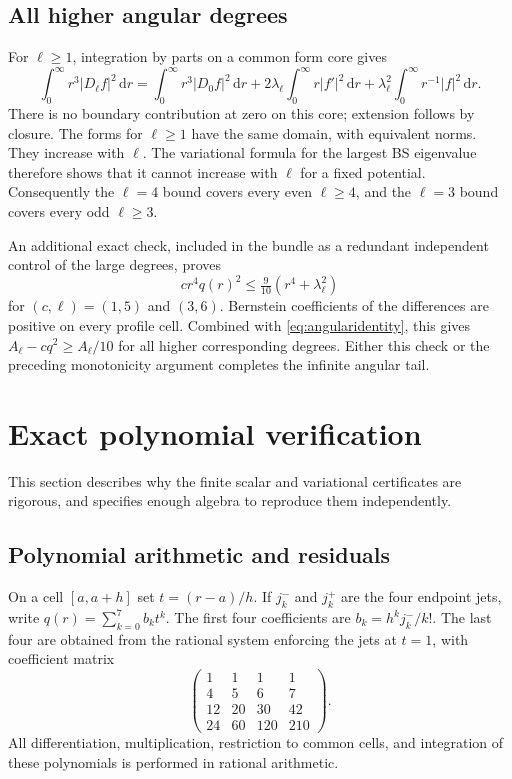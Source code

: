 \documentclass[11pt,a4paper]{article}
\theoremstyle{definition}\newtheorem{definition}[theorem]{Definition}
\theoremstyle{remark}\newtheorem{remark}[theorem]{Remark}
\newcommand{\dd}{\,\mathrm d}
\begin{document}
\subsection{All higher angular degrees}
For \(\ell\ge1\), integration by parts on a common form core gives
\begin{equation}\label{eq:angularidentity}
 \int_0^\infty r^3|D_\ell f|^2\dd r
 =\int_0^\infty r^3|D_0f|^2\dd r
 +2\lambda_\ell\int_0^\infty r|f'|^2\dd r
 +\lambda_\ell^2\int_0^\infty r^{-1}|f|^2\dd r.
\end{equation}
There is no boundary contribution at zero on this core; extension follows by closure. The forms for \(\ell\ge1\) have the same domain, with equivalent norms. They increase with \(\ell\). The variational formula for the largest BS eigenvalue therefore shows that it cannot increase with \(\ell\) for a fixed potential. Consequently the \(\ell=4\) bound covers every even \(\ell\ge4\), and the \(\ell=3\) bound covers every odd \(\ell\ge3\).

An additional exact check, included in the bundle as a redundant independent control of the large degrees, proves
\[
 c r^4 q(r)^2\le\tfrac9{10}(r^4+\lambda_\ell^2)
\]
for \((c,\ell)=(1,5)\) and \((3,6)\). Bernstein coefficients of the differences are positive on every profile cell. Combined with \eqref{eq:angularidentity}, this gives \(A_\ell-cq^2\ge A_\ell/10\) for all higher corresponding degrees. Either this check or the preceding monotonicity argument completes the infinite angular tail.

\section{Exact polynomial verification}\label{sec:poly}

This section describes why the finite scalar and variational certificates are rigorous, and specifies enough algebra to reproduce them independently.

\subsection{Polynomial arithmetic and residuals}
On a cell \([a,a+h]\) set \(t=(r-a)/h\). If \(j_k^-\) and \(j_k^+\) are the four endpoint jets, write \(q(r)=\sum_{k=0}^7b_kt^k\). The first four coefficients are \(b_k=h^kj_k^-/k!\). The last four are obtained from the rational system enforcing the jets at \(t=1\), with coefficient matrix
\[
 \begin{pmatrix}
 1&1&1&1\\4&5&6&7\\12&20&30&42\\24&60&120&210
 \end{pmatrix}.
\]
All differentiation, multiplication, restriction to common cells, and integration of these polynomials is performed in rational arithmetic.
\end{document}
